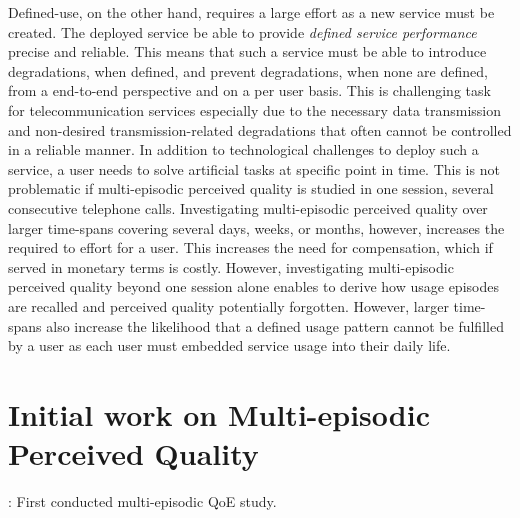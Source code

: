 Defined-use, on the other hand, requires a large effort as a new service must be created.
The deployed service be able to provide \emph{defined service performance} precise and reliable.
This means that such a service must be able to introduce degradations, when defined, and prevent degradations, when none are defined, from a end-to-end perspective and on a per user basis.
This is challenging task for telecommunication services especially due to the necessary data transmission and non-desired transmission-related degradations that often cannot be controlled in a reliable manner.
In addition to technological challenges to deploy such a service, a user needs to solve artificial tasks at specific point in time.
This is not problematic if multi-episodic perceived quality is studied in one session, \eg several consecutive telephone calls.
Investigating multi-episodic perceived quality over larger time-spans covering several days, weeks, or months, however, increases the required to effort for a user.
This increases the need for compensation, which if served in monetary terms is costly.
However, investigating multi-episodic perceived quality beyond one session alone enables to derive how usage episodes are recalled and perceived quality potentially forgotten.
However, larger time-spans also increase the likelihood that a defined usage pattern cannot be fulfilled by a user as each user must embedded service usage into their daily life.

\section{Initial work on Multi-episodic Perceived Quality}


\cite{moller_single-call_2011}: First conducted multi-episodic QoE study.

